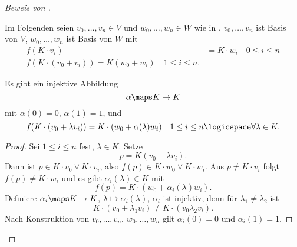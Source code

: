 \begin{proof}[Beweis von ]
\begin{subproof}
  \end{subproof}
  Im Folgenden seien \( v_0,\dotsc,v_n\in V\) und \( w_0,\dotsc,w_n\in W \) wie in , \dh \( v_0,\dotsc,v_n \) ist Basis von \( V \), \( w_0,\dotsc, w_n \) ist Basis von \( W \) mit
  \begin{align*}
    f(K\cdot v_i)&=K\cdot w_i\quad 0\leq i\leq n\\
    f(K\cdot (v_0+ v_i))=K(w_0+w_i)\quad 1\leq i\leq n.
  \end{align*}
  \begin{lemma}\label{kollineation_hat_zugehoerigen_vielleicht_automorphismus}
    Es gibt ein injektive Abbildung
    \begin{equation*}
      \alpha\maps K\to K
    \end{equation*}
    mit \( \alpha(0)=0 \), \( \alpha(1)=1 \), und
    \begin{equation*}
      f(K\cdot (v_0+\lambda v_i))=K\cdot (w_0+\alpha(\lambda)w_i)\quad 1\leq i\leq n\logicspace \forall \lambda\in K.
    \end{equation*}
  \end{lemma}
  \begin{proof}
    Sei \( 1\leq i\leq n \) fest, \( \lambda\in K \). Setze
    \begin{equation*}
      p=K(v_0+\lambda v_i).
    \end{equation*}
    Dann ist \( p\in K\cdot v_0\vee K\cdot v_i \), also \( f(p)\in K\cdot w_0\vee K\cdot w_i \). Aus \( p\neq K\cdot v_i \) folgt \( f(p)\neq K\cdot w_i \) und es gibt \( \alpha_i(\lambda)\in K \) mit 
    \begin{equation*}
      f(p)=K\cdot (w_0+\alpha_i(\lambda)w_i).
    \end{equation*}
    Definiere \( \alpha_i\maps K\to K \), \( \lambda\mapsto \alpha_i(\lambda) \), \( \alpha_i \) ist injektiv, denn für \( \lambda_1\neq \lambda_2 \) ist
    \begin{equation*}
      K\cdot (v_0+\lambda_1 v_i)\neq K\cdot (v_0\lambda_2 v_i).
    \end{equation*}
    Nach Konstruktion von \( v_0,\dotsc,v_n \), \( w_0,\dotsc,w_n \) gilt \( \alpha_i(0)=0 \) und \( \alpha_i(1)=1 \).


\end{proof}
\end{proof}
